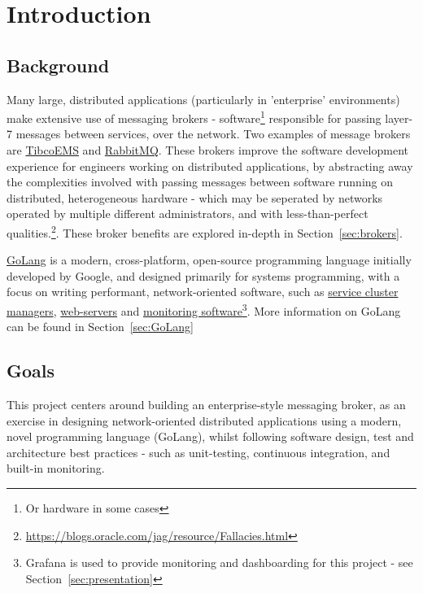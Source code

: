 \chapter{Introduction}
\label{chap:Introduction}

\section{Background}
\label{sec:Background}

Many large, distributed applications (particularly in 'enterprise' environments)
make extensive use of messaging brokers - software\footnote{Or hardware in some
cases\cite{solaceappliances}} responsible for passing layer-7 messages between
services, over the network. Two examples of message brokers are
\href{http://www.tibco.com/products/automation/enterprise-messaging/enterprise-message-service}{TibcoEMS}
and \href{https://www.rabbitmq.com/}{RabbitMQ}. These brokers improve the
software development experience for engineers working on distributed
applications, by abstracting away the complexities involved with passing
messages between software running on distributed, heterogeneous hardware - which
may be seperated by networks operated by multiple different administrators, and
with less-than-perfect
qualities.\footnote{\url{https://blogs.oracle.com/jag/resource/Fallacies.html}}. These broker benefits are explored in-depth in Section~\ref{sec:brokers}.

\href{https://golang.org/}{GoLang} is a modern, cross-platform, open-source
programming language initially developed by Google, and designed primarily for
systems programming, with a focus on writing performant, network-oriented
software, such as \href{https://github.com/kubernetes/kubernetes}{service
cluster managers}, \href{https://github.com/mholt/caddy}{web-servers} and
\href{https://github.com/grafana/grafana}{monitoring software}\footnote{Grafana
is used to provide monitoring and dashboarding for this project - see
Section~\ref{sec:presentation}}. More information on GoLang can be found in
Section~\ref{sec:GoLang}

\section{Goals}
This project centers around building an enterprise-style messaging broker,
as an exercise in designing network-oriented distributed applications using a modern, novel programming language (GoLang), whilst following software design, test and architecture best practices - such as unit-testing, continuous integration, and built-in monitoring.

